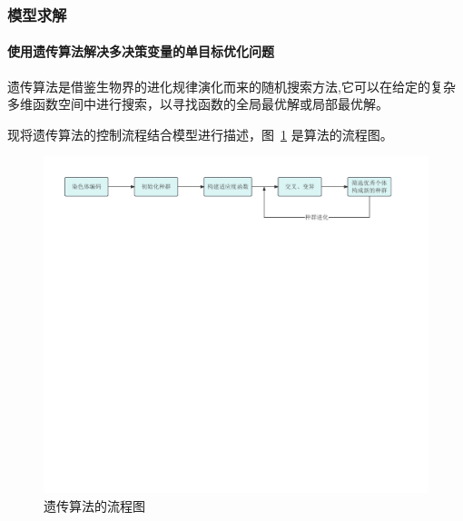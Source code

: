 \subsubsection{模型求解}
\paragraph{使用遗传算法解决多决策变量的单目标优化问题}
遗传算法是借鉴生物界的进化规律演化而来的随机搜索方法,它可以在给定的复杂多维函数空间中进行搜索，以寻找函数的全局最优解或局部最优解。

现将遗传算法的控制流程结合模型进行描述，图~\ref{liucheng} 是算法的流程图。

\bigskip
\begin{figure}[H]
\centering
\includegraphics[scale=0.65]{liucheng.pdf}
\caption{\kaishu 遗传算法的流程图}\label{liucheng}
\end{figure}
